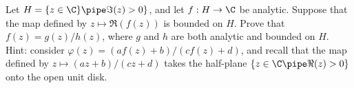 Let $H=\{z\in \C\}\pipe \Im(z)>0\}$, and let $f:H\rightarrow \C$ be
analytic. Suppose that the map defined by $z\mapsto \Re(f(z))$ is
bounded on $H$. Prove that $f(z)=g(z)/h(z)$, where $g$ and $h$ are
both analytic and bounded on $H$. Hint: consider
$\varphi(z)=(af(z)+b)/(cf(z)+d)$, and recall that the map defined by
$z\mapsto (az+b)/(cz+d)$ takes the half-plane $\{z\in \C\pipe
\Re(z)>0\}$ onto the open unit disk. 
